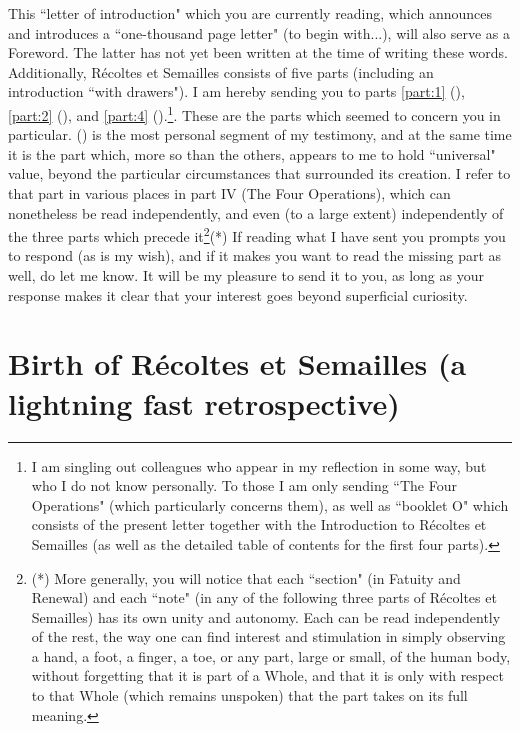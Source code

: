 This ``letter of introduction" which you are currently reading, which announces and
introduces a ``one-thousand page letter" (to begin with...), will also serve as a
Foreword. The latter has not yet been written at the time of writing these words.
Additionally, R\'ecoltes et Semailles consists of five parts (including an introduction
``with drawers"). I am hereby sending you to parts 
\ref{part:1} (), 
\ref{part:2} (),  and 
\ref{part:4} ().\footnote{I am singling out colleagues who appear in my reflection in some way, but who I do not know personally. To those I am only sending ``The Four Operations" (which particularly concerns them), as well as ``booklet O" which consists of the present letter together with the Introduction to R\'ecoltes et Semailles (as well as the detailed table of contents for the first four parts).}. These are the parts which seemed to concern you in particular. 
 () 
is the most personal segment of my testimony, and at the same time it is the part which, more so than the others, appears to me to hold ``universal" value, beyond the particular circumstances that surrounded its creation. I refer to that part in various places in part IV (The Four Operations), which can nonetheless be read independently, and even (to a large extent) independently of the three parts which precede it\footnote{(*) More generally, you will notice that each ``section" (in Fatuity and Renewal) and each ``note" (in any of the following three parts of R\'ecoltes et Semailles) has its own unity and autonomy. Each can be read independently of the rest, the way one can find interest and stimulation in simply observing a hand, a foot, a finger, a toe, or any part, large or small, of the human body, without forgetting that it is part of a Whole, and that it is only with respect to that Whole (which remains unspoken) that the part takes on its full meaning.}(*) If reading what I have sent you prompts you to respond (as is my wish), and if it makes you want to read the missing part as well, do let me know. It will be my pleasure to send it to you, as long as your response makes it clear that your interest goes beyond superficial curiosity.

\section{Birth of R\'ecoltes et Semailles (a lightning fast retrospective)}

